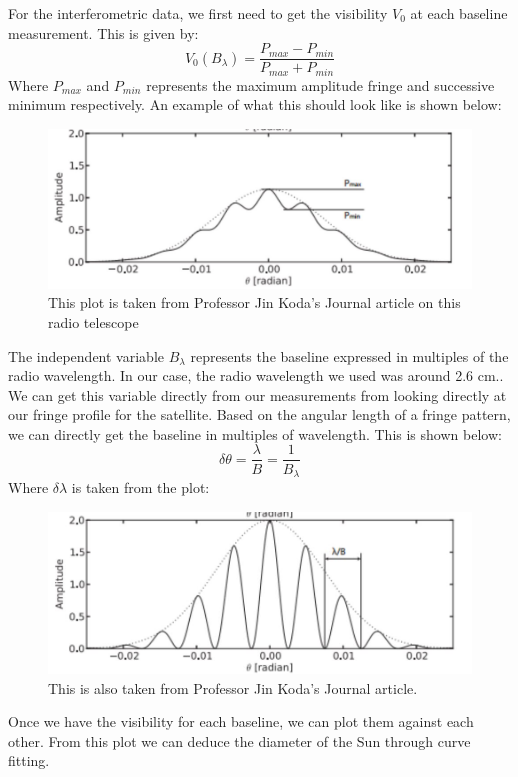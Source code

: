 \documentclass{aastex61}
\begin{document}
For the interferometric data, we first need to get the visibility $V_{0}$ at each baseline measurement. This is given by:
\begin{equation}
	V_{0}(B_{\lambda}) = \frac{P_{max}-P_{min}}{P_{max}+P_{min}}
\end{equation}
Where $P_{max}$ and $P_{min}$ represents the maximum amplitude fringe and successive minimum respectively. An example of what this should look like is shown below:
\begin{figure}[hbt!]
	\centering
	\includegraphics[scale = .45]{aaaa.jpg}
	\caption{This plot is taken from Professor Jin Koda's Journal article on this radio telescope}
	\label{fig: refcurve1}
\end{figure}
The independent variable $B_{\lambda}$ represents the baseline expressed in multiples of the radio wavelength. In our case, the radio wavelength we used was around 2.6 cm.. We can get this variable directly from our measurements from looking directly at our fringe profile for the satellite. Based on the angular length of a fringe pattern, we can directly get the baseline in multiples of wavelength. This is shown below:
\begin{equation}
	\delta\theta = \frac{\lambda}{B} = \frac{1}{B_{\lambda}}
\end{equation}
Where $\delta\lambda$ is taken from the plot:
\begin{figure}[hbt!]
	\centering
	\includegraphics[scale = .45]{assssssssssssss.jpg}
	\caption{This is also taken from Professor Jin Koda's Journal article.}
	\label{fig: refcurve1}
\end{figure}
Once we have the visibility for each baseline, we can plot them against each other. From this plot we can deduce the diameter of the Sun through curve fitting.
\end{document}
